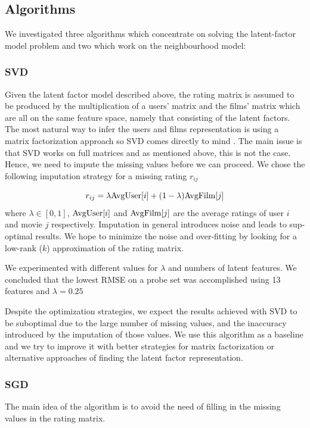 \documentclass[10pt,conference,compsocconf]{IEEEtran}
\begin{document}
\subsection{Algorithms}
We investigated three algorithms which concentrate on solving the latent-factor model problem and two which work on the neighbourhood model:

\subsubsection*{\textbf{SVD}} Given the latent factor model described above, the rating matrix is assumed to be produced by the multiplication of a users' matrix and the films' matrix which are all on the same feature space, namely that consisting of the latent factors. The most natural way to infer the users and films representation is using a matrix factorization approach so SVD comes directly to mind \cite{Koren09matrixfactorization}. The main issue is that SVD works on full matrices and as mentioned above, this is not the case. Hence, we need to impute the missing values before we can proceed. We chose the following imputation strategy for a missing rating $r_{ij}$

\begin{equation}
r_{ij}= \lambda \textnormal{AvgUser}[i] + (1 - \lambda) \textnormal{AvgFilm}[j]
\label{eq:imputation}
\end{equation}
where $\lambda \in [0,1]$, $\textnormal{AvgUser}[i]$ and $\textnormal{AvgFilm}[j]$ are the average ratings of user $i$ and movie $j$ respectively. Imputation in general introduces noise and leads to sup-optimal results. We hope to minimize the noise and over-fitting by looking for a low-rank ($k$) approximation of the rating matrix. 

We experimented with different values for $\lambda$ and numbers of latent features. We concluded that the lowest RMSE on a probe set was accomplished using 13 features and $\lambda = 0.25$

Despite the optimization strategies, we expect the results achieved with SVD to be suboptimal due to the large number of missing values, and the inaccuracy introduced by the imputation of those values. We use this algorithm as a baseline and we try to improve it with better strategies for matrix factorization or alternative approaches of finding the latent factor representation.

\subsubsection*{\textbf{SGD}} The main idea of the algorithm is to avoid the need of filling in the missing values in the rating matrix. 
\end{document}

